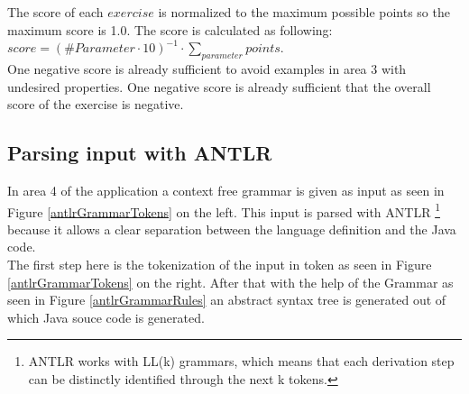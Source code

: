 \noindent The score of each $exercise$ is normalized to the maximum possible points so the maximum score is 1.0. The score is calculated as following:\\ $score = (\#Parameter\cdot10)^{-1}\cdot\sum\limits_{parameter}^{}points$. \\
One negative score is already sufficient to avoid examples in area 3 with undesired properties. One negative score is already sufficient that the overall score of the exercise is negative.
\pagebreak

\subsection{Parsing input with ANTLR}
In area 4 of the application a context free grammar is given as input as seen in Figure \ref{antlrGrammarTokens} on the left. This input is parsed with ANTLR \footnote{ANTLR works with LL(k) grammars, which means that each derivation step can be distinctly identified through the next k tokens.} because it allows a clear separation between the language definition and the Java code.\\
The first step here is the tokenization of the input in token as seen in Figure \ref{antlrGrammarTokens} on the right. After that with the help of the Grammar as seen in Figure \ref{antlrGrammarRules} an abstract syntax tree is generated out of which Java souce code is generated.\\
\noindent
